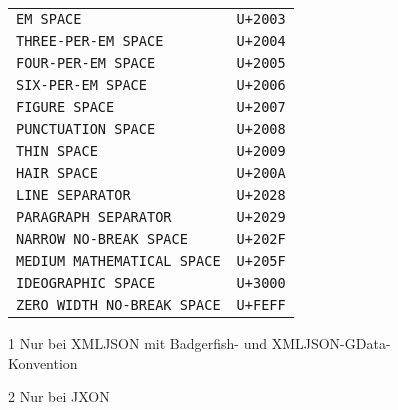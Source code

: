 \begin{figure}[h!]
\begin{center}
\begin{threeparttable}
\begin{tabular}{lr}
                                 \texttt{EM SPACE}                           & \texttt{U+2003}\\
            \rowcolor{rubgray!50}\texttt{THREE-PER-EM SPACE}                 & \texttt{U+2004}\\
                                 \texttt{FOUR-PER-EM SPACE}                  & \texttt{U+2005}\\
            \rowcolor{rubgray!50}\texttt{SIX-PER-EM SPACE}                   & \texttt{U+2006}\\
                                 \texttt{FIGURE SPACE}                       & \texttt{U+2007}\\
            \rowcolor{rubgray!50}\texttt{PUNCTUATION SPACE}                  & \texttt{U+2008}\\
                                 \texttt{THIN SPACE}                         & \texttt{U+2009}\\
            \rowcolor{rubgray!50}\texttt{HAIR SPACE}                         & \texttt{U+200A}\\
                                 \texttt{LINE SEPARATOR}                     & \texttt{U+2028}\\
            \rowcolor{rubgray!50}\texttt{PARAGRAPH SEPARATOR}                & \texttt{U+2029}\\
                                 \texttt{NARROW NO-BREAK SPACE}              & \texttt{U+202F}\\
            \rowcolor{rubgray!50}\texttt{MEDIUM MATHEMATICAL SPACE}          & \texttt{U+205F}\\
                                 \texttt{IDEOGRAPHIC SPACE}                  & \texttt{U+3000}\\
            \rowcolor{rubgray!50}\texttt{ZERO WIDTH NO-BREAK SPACE}\tnote{2} & \texttt{U+FEFF}\\
            \bottomrule
            \end{tabular}
            \begin{tablenotes}
                \item[1] Nur bei XMLJSON mit Badgerfish- und XMLJSON-GData-Konvention
                \item[2] Nur bei JXON
            \end{tablenotes}
        \end{threeparttable}
        \endgroup
    \end{center}
\end{figure}

\newpage{}
